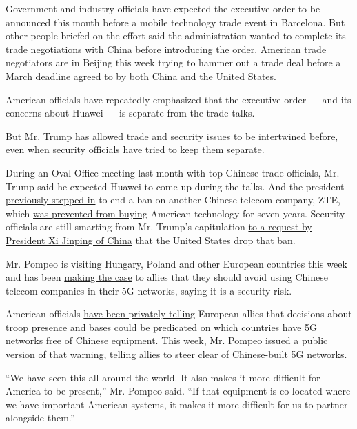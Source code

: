 Government and industry officials have expected the executive order to
be announced this month before a mobile technology trade event in
Barcelona. But other people briefed on the effort said the
administration wanted to complete its trade negotiations with China
before introducing the order. American trade negotiators are in Beijing
this week trying to hammer out a trade deal before a March deadline
agreed to by both China and the United States.

American officials have repeatedly emphasized that the executive order
--- and its concerns about Huawei --- is separate from the trade talks.

But Mr. Trump has allowed trade and security issues to be intertwined
before, even when security officials have tried to keep them separate.

During an Oval Office meeting last month with top Chinese trade
officials, Mr. Trump said he expected Huawei to come up during the
talks. And the president
\href{https://www.nytimes.com/2018/06/07/business/what-is-zte.html}{previously
stepped in} to end a ban on another Chinese telecom company, ZTE, which
\href{https://www.nytimes.com/2018/04/16/technology/chinese-tech-company-blocked-from-buying-american-components.html}{was
prevented from buying} American technology for seven years. Security
officials are still smarting from Mr. Trump's capitulation
\href{https://www.nytimes.com/2018/06/07/business/us-china-zte-deal.html}{to
a request by President Xi Jinping of China} that the United States drop
that ban.

Mr. Pompeo is visiting Hungary, Poland and other European countries this
week and has been
\href{https://www.nytimes.com/2019/02/12/world/europe/czech-republic-huawei.html}{making
the case} to allies that they should avoid using Chinese telecom
companies in their 5G networks, saying it is a security risk.

American officials
\href{https://www.nytimes.com/2019/01/26/us/politics/huawei-china-us-5g-technology.html}{have
been privately telling} European allies that decisions about troop
presence and bases could be predicated on which countries have 5G
networks free of Chinese equipment. This week, Mr. Pompeo issued a
public version of that warning, telling allies to steer clear of
Chinese-built 5G networks.

``We have seen this all around the world. It also makes it more
difficult for America to be present,'' Mr. Pompeo said. ``If that
equipment is co-located where we have important American systems, it
makes it more difficult for us to partner alongside them.''

